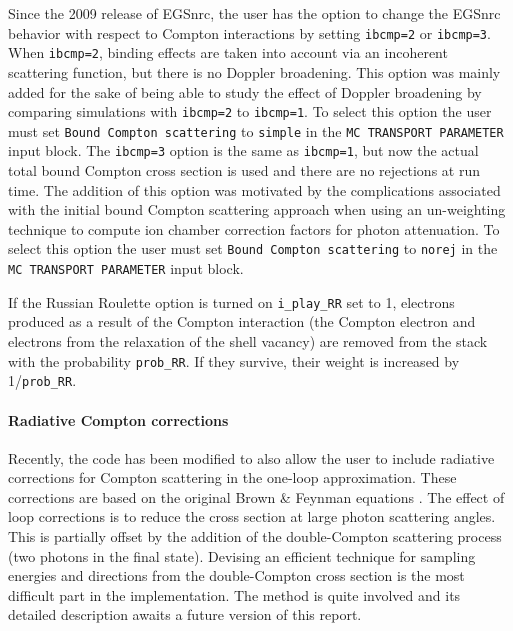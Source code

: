Since the 2009 release of EGSnrc, the user has the option to change 
the EGSnrc behavior with respect to Compton interactions by 
setting {\tt ibcmp=2} or {\tt ibcmp=3}.
When {\tt ibcmp=2}, binding effects are taken into account via an 
incoherent scattering function, but there is no Doppler broadening.
This option was mainly added for the sake of being able to study the 
effect of Doppler broadening by comparing simulations with 
{\tt ibcmp=2} to {\tt ibcmp=1}. To select this option the user
must set {\tt Bound Compton scattering} to {\tt simple} in the
{\tt MC TRANSPORT PARAMETER} input block.
The {\tt ibcmp=3} option is the same as {\tt ibcmp=1}, but now the actual total 
bound Compton cross section 
is used and there are no rejections at run time. The addition of this option 
was motivated by the complications associated with the initial bound 
Compton scattering approach when using an un-weighting technique to compute 
ion chamber correction factors for photon attenuation. 
To select this option the user
must set {\tt Bound Compton scattering} to {\tt norej} in the
{\tt MC TRANSPORT PARAMETER} input block.

If the Russian Roulette option is turned on {\tt i\_play\_RR} set 
to 1, electrons produced as a result of the Compton interaction 
(the Compton electron and electrons from the relaxation of 
the shell vacancy) are removed from the stack with the probability 
{\tt prob\_RR}. If they survive, their weight is increased by 
1/{\tt prob\_RR}. 

\paragraph{Radiative Compton corrections}\hfill
{}
\label{radc_corrections}

Recently, the code has been modified to also allow the user to include
radiative corrections for Compton scattering in the one-loop approximation. 
These corrections are based on the original 
Brown \& Feynman equations \cite{BF52}. The effect of loop corrections is to 
reduce the cross section at large photon scattering angles. This is partially 
offset by the addition of the double-Compton scattering process (two photons in 
the final state). Devising an efficient technique for sampling energies and 
directions from the double-Compton cross section is the most difficult part 
in the implementation. The method is quite involved and its detailed description 
awaits a future version of this report. 

